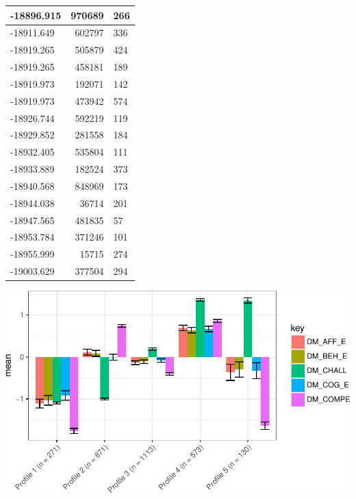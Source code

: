 \documentclass[]{book}
\theoremstyle{definition}
\theoremstyle{definition}
\theoremstyle{definition}
\theoremstyle{remark}
\begin{document}
\begin{tabular}{l|r|l}
\hline
-18896.915 & 970689 & 266\\
\hline
-18911.649 & 602797 & 336\\
\hline
-18919.265 & 505879 & 424\\
\hline
-18919.265 & 458181 & 189\\
\hline
-18919.973 & 192071 & 142\\
\hline
-18919.973 & 473942 & 574\\
\hline
-18926.744 & 592219 & 119\\
\hline
-18929.852 & 281558 & 184\\
\hline
-18932.405 & 535804 & 111\\
\hline
-18933.889 & 182524 & 373\\
\hline
-18940.568 & 848969 & 173\\
\hline
-18944.038 & 36714 & 201\\
\hline
-18947.565 & 481835 & 57\\
\hline
-18953.784 & 371246 & 101\\
\hline
-18955.999 & 15715 & 274\\
\hline
-19003.629 & 377504 & 294\\
\hline
\end{tabular}

\begin{center}\includegraphics[width=0.8\linewidth]{rosenberg-dissertation_files/figure-latex/spec-solutions-model2-5-1} \end{center}
\end{document}
